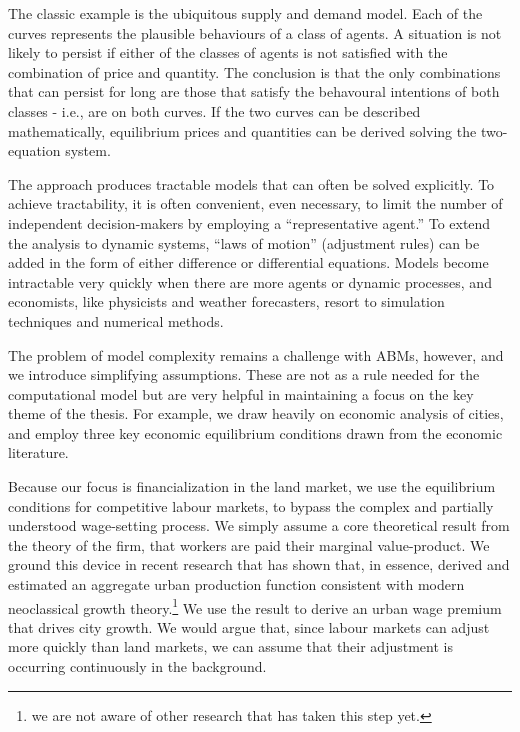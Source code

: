 The classic example is the ubiquitous supply and demand model. Each of the curves represents the plausible behaviours of a class of agents. A  situation is not likely to persist if either of the classes of agents is not satisfied with the combination of price and quantity. The conclusion   is that the only combinations that can persist for long are  those that satisfy the behavoural intentions of both classes - i.e., are on both curves. If the two curves can be described mathematically, equilibrium prices and quantities can be derived solving the two-equation system.

The approach produces tractable  models that can often be solved explicitly. To achieve tractability, it is often convenient, even necessary, to limit the number of independent decision-makers by employing a ``representative agent.'' To extend the analysis to dynamic systems, ``laws of motion'' (adjustment rules)  can be added in the form of either difference or differential equations.   Models become intractable very quickly when there are more agents or dynamic processes, and economists, like physicists and weather forecasters, resort to simulation techniques  and numerical methods. 



The problem of model complexity remains a challenge with ABMs, however, and we introduce simplifying assumptions. These are not as a rule needed for the computational model but are very helpful in maintaining a focus on the key theme  of the thesis. For example, we draw heavily on economic analysis of cities, and employ three key economic equilibrium conditions drawn from the economic literature. 


Because our focus is financialization in the land market, we use  the equilibrium conditions for competitive labour markets, to bypass the complex and partially understood wage-setting process. We simply assume a core theoretical result from the theory of the firm, that workers are paid their marginal value-product. We ground this device in recent research that has shown that, in essence, derived and estimated an aggregate urban production function consistent with modern neoclassical growth theory.\footnote{we are not aware of other research that has taken this step yet.} We use the result to derive an urban wage premium that drives city growth. We would argue that, since labour markets can adjust more quickly than land markets, we can assume that their adjustment is occurring continuously in the background.  

